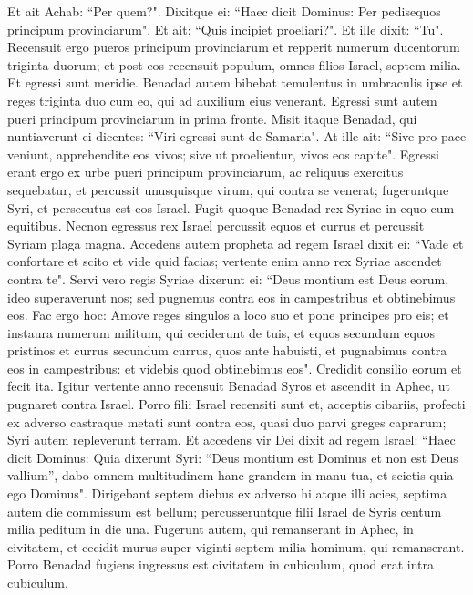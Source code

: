 \begin{biblechapter}
\verse Et ait Achab: “Per quem?". Dixitque ei: “Haec dicit Dominus: Per pedisequos principum provinciarum". Et ait: “Quis incipiet proeliari?". Et ille dixit: “Tu". 
\verse Recensuit ergo pueros principum provinciarum et repperit numerum ducentorum triginta duorum; et post eos recensuit populum, omnes filios Israel, septem milia. 
\verse Et egressi sunt meridie. Benadad autem bibebat temulentus in umbraculis ipse et reges triginta duo cum eo, qui ad auxilium eius venerant.  
\verse Egressi sunt autem pueri principum provinciarum in prima fronte. Misit itaque Benadad, qui nuntiaverunt ei dicentes: “Viri egressi sunt de Samaria". 
\verse At ille ait: “Sive pro pace veniunt, apprehendite eos vivos; sive ut proelientur, vivos eos capite". 
\verse Egressi erant ergo ex urbe pueri principum provinciarum, ac reliquus exercitus sequebatur, 
\verse et percussit unusquisque virum, qui contra se venerat; fugeruntque Syri, et persecutus est eos Israel. Fugit quoque Benadad rex Syriae in equo cum equitibus. 
\verse Necnon egressus rex Israel percussit equos et currus et percussit Syriam plaga magna. 
\verse Accedens autem propheta ad regem Israel dixit ei: “Vade et confortare et scito et vide quid facias; vertente enim anno rex Syriae ascendet contra te". 
\verse Servi vero regis Syriae dixerunt ei: “Deus montium est Deus eorum, ideo superaverunt nos; sed pugnemus contra eos in campestribus et obtinebimus eos.  
\verse Fac ergo hoc: Amove reges singulos a loco suo et pone principes pro eis;  
\verse et instaura numerum militum, qui ceciderunt de tuis, et equos secundum equos pristinos et currus secundum currus, quos ante habuisti, et pugnabimus contra eos in campestribus: et videbis quod obtinebimus eos". Credidit consilio eorum et fecit ita. 
\verse Igitur vertente anno recensuit Benadad Syros et ascendit in Aphec, ut pugnaret contra Israel. 
\verse Porro filii Israel recensiti sunt et, acceptis cibariis, profecti ex adverso castraque metati sunt contra eos, quasi duo parvi greges caprarum; Syri autem repleverunt terram. 
\verse Et accedens vir Dei dixit ad regem Israel: “Haec dicit Dominus: Quia dixerunt Syri: “Deus montium est Dominus et non est Deus vallium”, dabo omnem multitudinem hanc grandem in manu tua, et scietis quia ego Dominus". 
\verse Dirigebant septem diebus ex adverso hi atque illi acies, septima autem die commissum est bellum; percusseruntque filii Israel de Syris centum milia peditum in die una. 
\verse Fugerunt autem, qui remanserant in Aphec, in civitatem, et cecidit murus super viginti septem milia hominum, qui remanserant. Porro Benadad fugiens ingressus est civitatem in cubiculum, quod erat intra cubiculum. 

\end{biblechapter}
